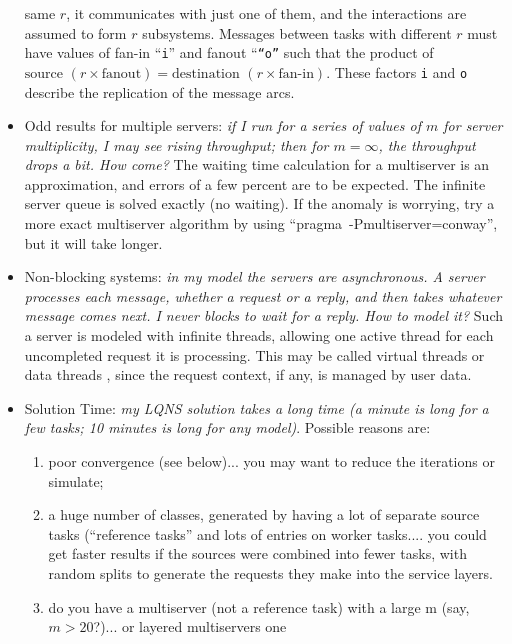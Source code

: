 \documentclass[11pt]{article}
\makeatletter
\newcommand{\parameter}[1]{\texttt{#1}\index{#1@\texttt{#1}}}
\makeatother
\begin{document}
\begin{itemize}
  same $r$, it communicates with just one of them, and the interactions
  are assumed to form $r$ subsystems. Messages between tasks with
  different $r$ must have values of fan-in ``\parameter{i}'' and fanout ``\parameter{``o''} such that
  the product of $\textrm{source~} (r \times \textrm{fanout}) = \textrm{destination~} (r \times
  \textrm{fan-in})$. These factors \parameter{i} and \parameter{o} describe the replication of the
  message arcs. 
\item Odd results for multiple servers: \emph{if I run for a series of
    values of $m$ for server multiplicity, I may see rising throughput;
    then for $m=\infty$, the throughput drops a bit. How come?} The
  waiting time calculation for a multiserver is an approximation, and
  errors of a few percent are to be expected. The infinite server
  queue is solved exactly (no waiting). If the anomaly is worrying,
  try a more exact multiserver algorithm by using
    ``pragma~-Pmultiserver=conway'', but it will take longer. 
\item Non-blocking systems: \emph{in my model the servers are
  asynchronous. A server processes each message, whether a request or
  a reply, and then takes whatever message comes next. I never blocks
  to wait for a reply. How to model it?} Such a server is modeled with
  infinite threads, allowing one active thread for each uncompleted
  request it is processing. This may be called virtual threads or data
  threads , since the request context, if any, is managed by user
  data.
\item Solution Time: \emph{my LQNS solution takes a long time (a
    minute is long for a few tasks; 10 minutes is long for any
    model)}. Possible reasons are:
  \begin{enumerate}
  \item poor convergence (see below)...
  you may want to reduce the iterations or simulate;
\item a huge number
  of classes, generated by having a lot of separate source
  tasks (``reference tasks'' and lots of entries on worker tasks.... you
  could get faster results if the sources were combined into fewer
  tasks, with random splits to generate the requests they make into
  the service layers.
\item do you have a multiserver (not a reference
  task) with a large m (say, $m> 20$?)... or layered multiservers one

\end{enumerate}
\end{itemize}
\end{document}
